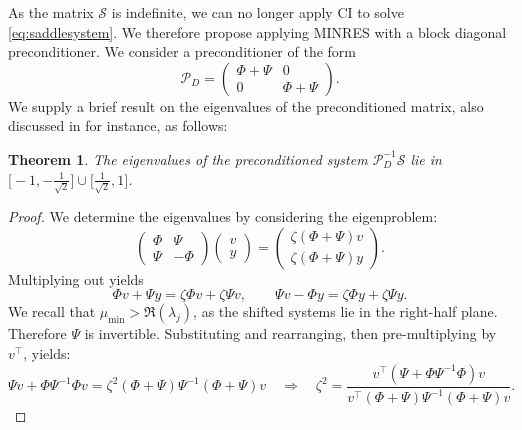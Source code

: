 \documentclass{article}
\newtheorem{thm}{Theorem}
\newcommand{\phimat}{\Phi}
\newcommand{\psimat}{\Psi}
\newcommand{\lamalt}{\zeta}
\theoremstyle{definition}
\begin{document}
{		As the matrix $\mathcal{S}$ is indefinite, we can no longer apply CI to solve \eqref{eq:saddlesystem}. We therefore propose applying MINRES with a block diagonal preconditioner. 
		We consider a preconditioner of the form \cite[Section 4.1]{Zulehner}
		\begin{equation}\label{eq:minresprecond}
			\mathcal{P}_{D} =\begin{pmatrix}
				\phimat + \psimat & 0 \\ 0 & \phimat+\psimat
			\end{pmatrix}.
		\end{equation}
		We supply a brief result on the eigenvalues of the preconditioned matrix, also discussed in \cite[Section 4.1]{Zulehner} for instance, as follows:
		\begin{thm}
			The eigenvalues of the preconditioned system $\mathcal{P}_{D}^{-1}\mathcal{S}$ lie in  $\big[-1,-\frac{1}{\sqrt{2}}\big] \cup \big[\frac{1}{\sqrt{2}},1\big]$.
		\end{thm}
		\begin{proof}
			We determine the eigenvalues by considering the eigenproblem:
			\begin{equation*}
				\begin{pmatrix}
					\phimat & \psimat\\
					\psimat & -\phimat
				\end{pmatrix}\begin{pmatrix}
					{v} \\ y
				\end{pmatrix} = \begin{pmatrix}
					\lamalt(\phimat+\psimat){v}\\ \lamalt(\phimat+\psimat)y
				\end{pmatrix}.
			\end{equation*}
			Multiplying out yields
			\begin{equation*}
				\phimat{v} + \psimat y = \lamalt \phimat{v} + \lamalt \psimat{v}, \qquad \psimat{v} - \phimat y = \lamalt \phimat y + \lamalt \psimat y.
			\end{equation*}
			{We recall that $\mu_{\min} > {\Re({\lambda_j})}$, as the shifted systems lie in the right-half plane. Therefore $\psimat$ is invertible.} Substituting and rearranging, then pre-multiplying by ${v}^{\top}$, yields:
			\begin{equation*}
				\psimat{v} + \phimat \psimat^{-1}\phimat {v} = \lamalt^2(\phimat+\psimat)\psimat^{-1}(\phimat+\psimat){v} \quad \Rightarrow \quad \lamalt^2 = \frac{{v}^{\top}(\psimat+\phimat \psimat^{-1}\phimat){v}}{{v}^{\top}(\phimat+\psimat)\psimat^{-1}(\phimat+\psimat){v}}.

\end{equation*}
\end{proof}}
\end{document}
